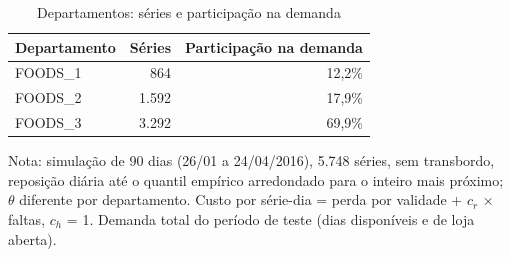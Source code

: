 \begin{table}[htbp]
\centering
\small
\caption{Departamentos: séries e participação na demanda}
\label{tab:het_pesos}
\begin{tabular}{lrr}
\toprule
Departamento & Séries & Participação na demanda \\
\midrule
FOODS\_1 & 864 & 12,2\% \\
FOODS\_2 & 1.592 & 17,9\% \\
FOODS\_3 & 3.292 & 69,9\% \\
\bottomrule
\end{tabular}
\par\smallskip
{\footnotesize Nota: simulação de 90 dias (26/01 a 24/04/2016), 5.748 séries, sem transbordo, reposição diária até o quantil empírico arredondado para o inteiro mais próximo; $\theta$ diferente por departamento. Custo por série-dia = perda por validade + $c_r$ × faltas, $c_h$ = 1. Demanda total do período de teste (dias disponíveis e de loja aberta).}
\end{table}

